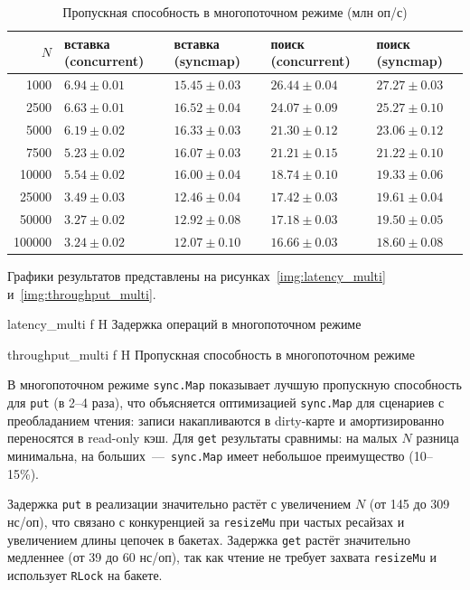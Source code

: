 \documentclass{itmo}
\begin{document}
\begin{table}[H]
	\centering
	\caption{Пропускная способность в многопоточном режиме (млн оп/с)}
	\label{tab:multi-throughput}
	\begin{tabularx}{\textwidth}{|r|X|X|X|X|}
		\toprule
		$N$ & вставка (concurrent) & вставка (syncmap) & поиск (concurrent) & поиск (syncmap) \\
		\midrule
		1000 & $6.94 \pm 0.01$ & $15.45 \pm 0.03$ & $26.44 \pm 0.04$ & $27.27 \pm 0.03$ \\
		2500 & $6.63 \pm 0.01$ & $16.52 \pm 0.04$ & $24.07 \pm 0.09$ & $25.27 \pm 0.10$ \\
		5000 & $6.19 \pm 0.02$ & $16.33 \pm 0.03$ & $21.30 \pm 0.12$ & $23.06 \pm 0.12$ \\
		7500 & $5.23 \pm 0.02$ & $16.07 \pm 0.03$ & $21.21 \pm 0.15$ & $21.22 \pm 0.10$ \\
		10000 & $5.54 \pm 0.02$ & $16.00 \pm 0.04$ & $18.74 \pm 0.10$ & $19.33 \pm 0.06$ \\
		25000 & $3.49 \pm 0.03$ & $12.46 \pm 0.04$ & $17.42 \pm 0.03$ & $19.61 \pm 0.04$ \\
		50000 & $3.27 \pm 0.02$ & $12.92 \pm 0.08$ & $17.18 \pm 0.03$ & $19.50 \pm 0.05$ \\
		100000 & $3.24 \pm 0.02$ & $12.07 \pm 0.10$ & $16.66 \pm 0.03$ & $18.60 \pm 0.08$ \\
		\bottomrule
	\end{tabularx}
\end{table}

Графики результатов представлены на рисунках~\ref{img:latency_multi} и~\ref{img:throughput_multi}.

	{latency_multi}
	{f}
	{H}
	{\textwidth}
	{Задержка операций в многопоточном режиме}

	{throughput_multi}
	{f}
	{H}
	{\textwidth}
	{Пропускная способность в многопоточном режиме}

В многопоточном режиме \texttt{sync.Map} показывает лучшую пропускную способность для \texttt{put} (в 2--4 раза), что объясняется оптимизацией \texttt{sync.Map} для сценариев с преобладанием чтения: записи накапливаются в dirty-карте и амортизированно переносятся в read-only кэш.
Для \texttt{get} результаты сравнимы: на малых $N$ разница минимальна, на больших~---~\texttt{sync.Map} имеет небольшое преимущество (10--15\%).

Задержка \texttt{put} в реализации значительно растёт с увеличением $N$ (от 145 до 309 нс/оп), что связано с конкуренцией за \texttt{resizeMu} при частых ресайзах и увеличением длины цепочек в бакетах.
Задержка \texttt{get} растёт значительно медленнее (от 39 до 60 нс/оп), так как чтение не требует захвата \texttt{resizeMu} и использует \texttt{RLock} на бакете.
\end{document}
